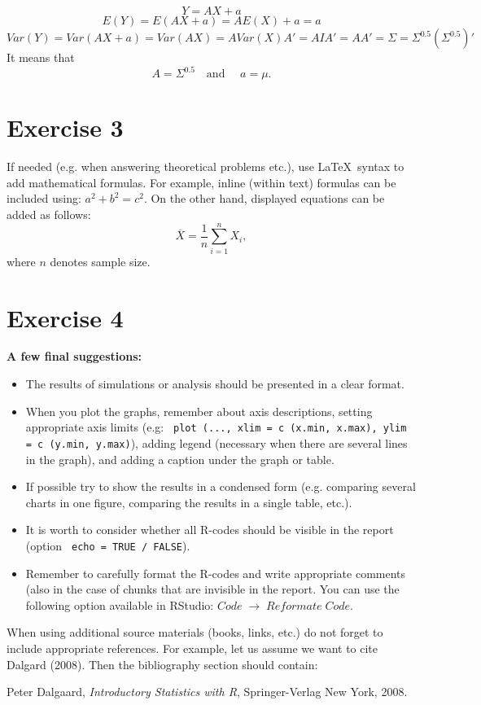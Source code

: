 \documentclass[12pt, a4paper]{article}\usepackage[]{graphicx}\usepackage[]{color}
\begin{document}
\[Y = AX+a\]
\[E(Y) = E(AX+a) = A E(X)+a = a \]
\[Var(Y) = Var(AX+a) = Var(AX) = A Var(X) A' = A I A' = A A' = \Sigma = \Sigma^{0.5} \left(\Sigma^{0.5}\right)' \]
It means that 
\[ A = \Sigma^{0.5} \quad \text{and }\quad a = \mu. \]


\section{Exercise 3}

If needed (e.g. when answering theoretical problems etc.), use \LaTeX \ syntax to add mathematical formulas. For example, inline (within text) formulas can be included using: $a^2+b^2=c^2$. On the other hand, 	displayed equations can be added as follows:
\begin{equation}
\label{eq:wzor1}
\overline{X} = \frac{1}{n}\sum_{i=1}^n X_i,
\end{equation}
where $n$ denotes sample size.


\section{Exercise 4}

{\bf A few final suggestions:}
\begin{itemize}
\item The results of simulations or analysis should be presented in a clear format.
\item When you plot the graphs, remember about axis descriptions, setting appropriate axis limits (e.g: \verb+ plot (..., xlim = c (x.min, x.max), ylim = c (y.min, y.max)+), adding legend (necessary when there are several lines in the graph), and adding a caption under the graph or table.
\item If possible try to show the results in a condensed form (e.g. comparing several charts in one figure, comparing the results in a single table, etc.).

\item It is worth to consider whether all R-codes should be visible in the report (option {\verb+ echo = TRUE / FALSE+}).

\item Remember to carefully format the R-codes and write appropriate comments (also in the case of chunks that are invisible in the report. You can use the following option available in RStudio: $Code \; \rightarrow\; Reformate \;  Code$.
\end{itemize}

When using additional source materials (books, links, etc.)
do not forget to include appropriate references.  For example, let us assume 
we want to cite Dalgard (2008). Then the bibliography section should contain:

\begin{thebibliography}{}
 
  Peter Dalgaard, \emph{Introductory Statistics with R}, Springer-Verlag New York, 2008.

\end{thebibliography}
\end{document}
